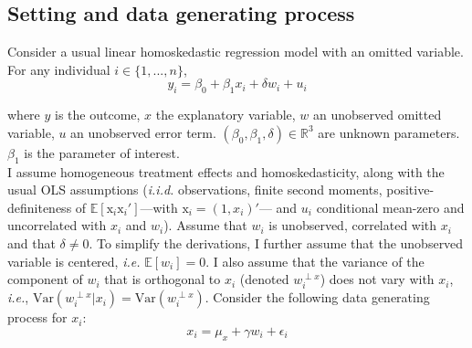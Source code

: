 \documentclass[usletter, 12pt]{article}
\begin{document}
				
		\subsection{Setting and data generating process}\label{maths_dgp}
		
			Consider a usual linear homoskedastic regression model with an omitted variable. For any individual $i \in \{1, ..., n\}$, 
							~
				\begin{equation}\label{maths_dgp_y}
					y_i = \beta_{0} + \beta_{1}x_{i} + \delta w_{i} + u_i
				\end{equation}
				
				where $y$ is the outcome, $x$ the explanatory variable,  $w$ an unobserved omitted variable, $u$ an unobserved error term.  $(\beta_0, \beta_1, \delta) \in \mathbb{R}^{3}$ are unknown parameters. $\beta_1$ is the parameter of interest.\\
			
			I assume homogeneous treatment effects and homoskedasticity, along with the usual OLS assumptions (\textit{i.i.d.} observations, finite second moments, positive-definiteness of $\mathbb{E}[\text{x}_i \text{x}_i']$---with $\text{x}_i = (1, x_i)'$--- and $u_{i}$ conditional mean-zero and uncorrelated with $x_i$ and $w_i$). Assume that $w_{i}$ is unobserved, correlated with $x_{i}$ and that $\delta \neq 0$. To simplify the derivations, I further assume that the unobserved variable is centered, \textit{i.e.} $\mathbb{E}[w_i] = 0$. I also assume that the variance of the component of $w_{i}$ that is orthogonal to $x_{i}$ (denoted $w_{i}^{\perp x}$) does not vary with $x_{i}$, \textit{i.e.}, $\text{Var}(w_{i}^{\perp x}|x_{i}) = \text{Var}(w_{i}^{\perp x})$. Consider the following data generating process for $x_i$:
				~
				\begin{equation}\label{maths_dgp_x}
					x_i = \mu_{x} + \gamma w_{i} + \epsilon_i
				\end{equation}
				
\end{document}
